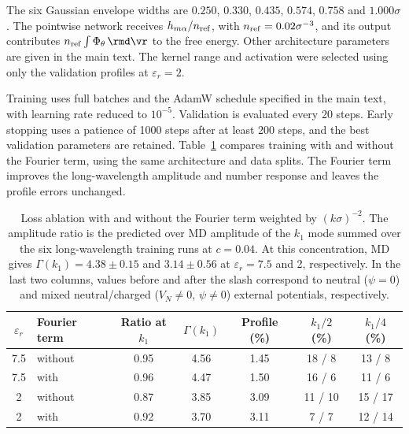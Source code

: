 The six Gaussian envelope widths are $0.250$, $0.330$, $0.435$, $0.574$, $0.758$ and $1.000\sigma$. The pointwise network receives $h_{m\alpha}/n_{\rm ref}$, with $n_{\rm ref}=0.02\sigma^{-3}$, and its output contributes $n_{\rm ref}\int\Phi_\theta\,\rmd\vr$ to the free energy. Other architecture parameters are given in the main text. The kernel range and activation were selected using only
the validation profiles at $\varepsilon_r=2$.

Training uses full batches and the AdamW schedule specified in the main text, with learning rate reduced to $10^{-5}$. Validation is evaluated every 20 steps. Early stopping uses a patience of 1000 steps after at least 200 steps, and the best validation parameters are retained.
Table~\ref{tab:S:spectrum} compares training with and without the Fourier term, using the same architecture and data splits. The Fourier term improves the long-wavelength amplitude and number response and leaves the profile errors unchanged.

\begin{table}[H]
\centering
\caption{Loss ablation with and without the Fourier term weighted by $(k\sigma)^{-2}$. The amplitude ratio is the predicted over MD amplitude of the $k_1$ mode summed over the six long-wavelength training runs at $c=0.04$. At this concentration, MD gives $\Gamma(k_1)=4.38\pm0.15$ and $3.14\pm0.56$ at $\varepsilon_r=7.5$ and 2, respectively. In the last two columns, values before and after the slash
correspond to neutral ($\psi=0$) and mixed neutral/charged
($V_N\neq0$, $\psi\neq0$) external potentials, respectively.}
\label{tab:S:spectrum}
\begin{tabular}{c l c c c c c}
$\varepsilon_r$ & Fourier term & Ratio at $k_1$ & $\Gamma(k_1)$  & Profile (\%) & $k_1/2$ (\%) & $k_1/4$ (\%)\\
\midrule
7.5 & without & 0.95 & 4.56 & 1.45 & 18 / 8 & 13 / 8\\
7.5 & with & 0.96 & 4.47 & 1.50 & 16 / 6 & 11 / 6\\
2 & without & 0.87 & 3.85 & 3.09 & 11 / 10 & 15 / 17\\
2 & with & 0.92 & 3.70 & 3.11 & 7 / 7 & 12 / 14\\
\bottomrule
\end{tabular}
\end{table}


